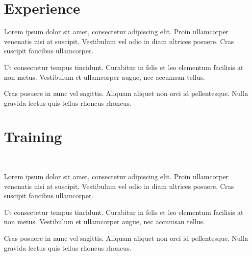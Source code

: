 \documentclass[]{plushcv}
\begin{document}
\begin{minipage}[t]{0.63\textwidth} 



\section{Experience}
\vspace{\topsep} %
\begin{tightemize}
\sectionsep
\item Lorem ipsum dolor sit amet, consectetur adipiscing elit. Proin ullamcorper venenatis nisi at suscipit. Vestibulum vel odio in diam ultrices posuere. Cras suscipit faucibus ullamcorper.
\item Ut consectetur tempus tincidunt. Curabitur in felis et leo elementum facilisis at non metus. Vestibulum et ullamcorper augue, nec accumsan tellus. 
\item Cras posuere in nunc vel sagittis. Aliquam aliquet non orci id pellentesque. Nulla gravida lectus quis tellus rhoncus rhoncus.  
\end{tightemize}
\sectionsep



\section{Training}
\\
\vspace{\topsep} %
\begin{tightemize}
\sectionsep
\item Lorem ipsum dolor sit amet, consectetur adipiscing elit. Proin ullamcorper venenatis nisi at suscipit. Vestibulum vel odio in diam ultrices posuere. Cras suscipit faucibus ullamcorper.
\item Ut consectetur tempus tincidunt. Curabitur in felis et leo elementum facilisis at non metus. Vestibulum et ullamcorper augue, nec accumsan tellus. \item Cras posuere in nunc vel sagittis. Aliquam aliquet non orci id pellentesque. Nulla gravida lectus quis tellus rhoncus rhoncus.  
\end{tightemize}
\sectionsep




\end{minipage}
\end{document}
